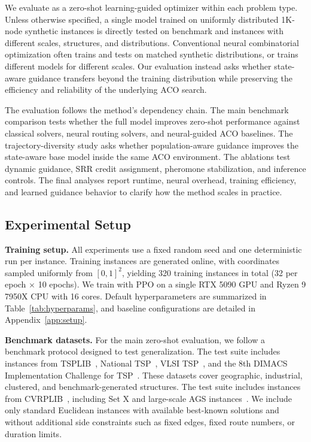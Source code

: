 
We evaluate \DyNACS{} as a zero-shot learning-guided optimizer within each problem type. Unless otherwise specified, a single model trained on uniformly distributed 1K-node synthetic instances is directly tested on benchmark \TSP{} and \CVRP{} instances with different scales, structures, and distributions. Conventional neural combinatorial optimization often trains and tests on matched synthetic distributions, or trains different models for different scales. Our evaluation instead asks whether state-aware guidance transfers beyond the training distribution while preserving the efficiency and reliability of the underlying ACO search.

The evaluation follows the method's dependency chain. The main benchmark comparison tests whether the full model improves zero-shot performance against classical solvers, neural routing solvers, and neural-guided ACO baselines. The trajectory-diversity study asks whether population-aware guidance improves the state-aware \DyNACO{} base model inside the same ACO environment. The ablations test dynamic guidance, SRR credit assignment, pheromone stabilization, and inference controls. The final analyses report runtime, neural overhead, training efficiency, and learned guidance behavior to clarify how the method scales in practice.

\subsection{Experimental Setup}
\label{sec:setup}

\smallskip\noindent\textbf{Training setup.}
All experiments use a fixed random seed and one deterministic run per instance. Training instances are generated online, with coordinates sampled uniformly from $[0,1]^2$, yielding 320 training instances in total (32 per epoch $\times$ 10 epochs). We train with PPO on a single RTX 5090 GPU and Ryzen 9 7950X CPU with 16 cores. Default \DyNACS{} hyperparameters are summarized in Table~\ref{tab:hyperparams}, and baseline configurations are detailed in Appendix~\ref{app:setup}.

\smallskip\noindent\textbf{Benchmark datasets.}
For the main zero-shot evaluation, we follow a benchmark protocol designed to test generalization. The \TSP{} test suite includes instances from TSPLIB~\cite{tsplib}, National TSP~\cite{nationaltsp}, VLSI TSP~\cite{vlsitsp}, and the 8th DIMACS Implementation Challenge for TSP~\cite{dimacs8tsp}. These datasets cover geographic, industrial, clustered, and benchmark-generated structures. The \CVRP{} test suite includes instances from CVRPLIB~\cite{cvrplib}, including Set X and large-scale AGS instances~\cite{ags}. We include only standard Euclidean instances with available best-known solutions and without additional side constraints such as fixed edges, fixed route numbers, or duration limits.

